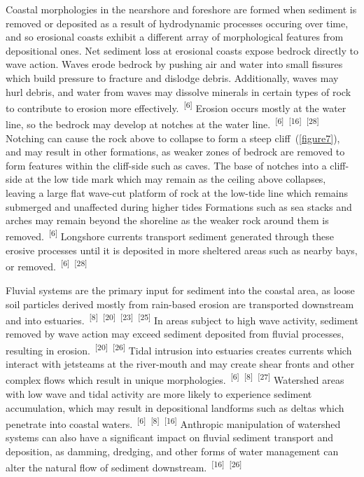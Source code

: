 \documentclass{article}
\begin{document}

\par{Coastal morphologies in the nearshore and foreshore are formed when sediment is removed or deposited as a result of hydrodynamic processes occuring over time, and so erosional coasts exhibit a different array of morphological features from depositional ones. Net sediment loss at erosional coasts expose bedrock directly to wave action. Waves erode bedrock by pushing air and water into small fissures which build pressure to fracture and dislodge debris. Additionally, waves may hurl debris, and water from waves may dissolve minerals in certain types of rock to contribute to erosion more effectively.~\textsuperscript{[6]} Erosion occurs mostly at the water line, so the bedrock may develop at notches at the water line.~\textsuperscript{[6]}~\textsuperscript{[16]}~\textsuperscript{[28]} Notching can cause the rock above to collapse to form a steep cliff~(\cref{figure7}), and may result in other formations, as weaker zones of bedrock are removed to form features within the cliff-side such as caves. The base of notches into a cliff-side at the low tide mark which may remain as the ceiling above collapses, leaving a large flat wave-cut platform of rock at the low-tide line which remains submerged and unaffected during higher tides Formations such as sea stacks and arches may remain beyond the shoreline as the weaker rock around them is removed.~\textsuperscript{[6]} Longshore currents transport sediment generated through these erosive processes until it is deposited in more sheltered areas such as nearby bays, or removed.~\textsuperscript{[6]}~\textsuperscript{[28]} }


\par{Fluvial systems are the primary input for sediment into the coastal area, as loose soil particles derived mostly from rain-based erosion are transported downstream and into estuaries.~\textsuperscript{[8]}~\textsuperscript{[20]}~\textsuperscript{[23]}~\textsuperscript{[25]} In areas subject to high wave activity, sediment removed by wave action may exceed sediment deposited from fluvial processes, resulting in erosion.~\textsuperscript{[20]}~\textsuperscript{[26]} Tidal intrusion into estuaries creates currents which interact with jetsteams at the river-mouth and may create shear fronts and other complex flows which result in unique morphologies.~\textsuperscript{[6]}~\textsuperscript{[8]}~\textsuperscript{[27]} Watershed areas with low wave and tidal activity are more likely to experience sediment accumulation, which may result in depositional landforms such as deltas which penetrate into coastal waters.~\textsuperscript{[6]}~\textsuperscript{[8]}~\textsuperscript{[16]} Anthropic manipulation of watershed systems can also have a significant impact on fluvial sediment transport and deposition, as damming, dredging, and other forms of water management can alter the natural flow of sediment downstream.~\textsuperscript{[16]}~\textsuperscript{[26]}}
\end{document}
